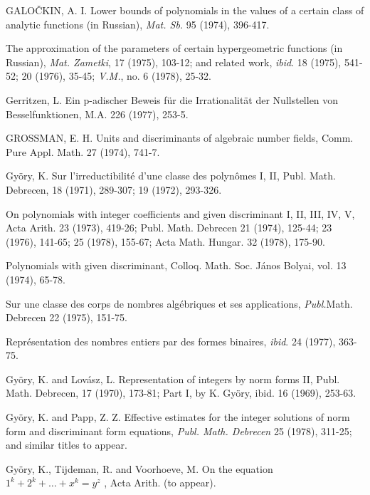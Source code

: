 \begin{hanglist}
    \item GALOČKIN, A. I. Lower bounds of polynomials in the values of a certain class of analytic functions (in Russian), \textit{Mat. Sb.} 95 (1974), 396-417.
    \item \hspace{1.5em} The approximation of the parameters of certain hypergeometric functions (in Russian), \textit{Mat. Zametki}, 17 (1975), 103-12; and related work, \textit{ibid}. 18 (1975), 541-52; 20 (1976), 35-45; \textit{V.M.}, no. 6 (1978), 25-32.
    \item Gerritzen, L. Ein p-adischer Beweis für die Irrationalität der Nullstellen von Besselfunktionen, M.A. 226 (1977), 253-5.
    \item GROSSMAN, E. H. Units and discriminants of algebraic number fields, Comm. Pure Appl. Math. 27 (1974), 741-7.
    \item Györy, K. Sur l'irreductibilité d'une classe des polynômes I, II, Publ. Math. Debrecen, 18 (1971), 289-307; 19 (1972), 293-326.
    \item \hspace{1.5em} On polynomials with integer coefficients and given discriminant I, II, III, IV, V, Acta Arith. 23 (1973), 419-26; Publ. Math. Debrecen 21 (1974), 125-44; 23 (1976), 141-65; 25 (1978), 155-67; Acta Math. Hungar. 32 (1978), 175-90.
    \item \hspace{1.5em} Polynomials with given discriminant, Colloq. Math. Soc. János Bolyai, vol. 13 (1974), 65-78.
    \item \hspace{1.5em} Sur une classe des corps de nombres algébriques et ses applications, \textit{Publ.}Math. Debrecen 22 (1975), 151-75.
    \item \hspace{1.5em} Représentation des nombres entiers par des formes binaires, \textit{ibid}. 24 (1977), 363-75.
    \item Györy, K. and Lovász, L. Representation of integers by norm forms II, Publ. Math. Debrecen, 17 (1970), 173-81; Part I, by K. Györy, ibid. 16 (1969), 253-63.
    \item Györy, K. and Papp, Z. Z. Effective estimates for the integer solutions of norm form and discriminant form equations, \textit{Publ. Math. Debrecen} 25 (1978), 311-25; and similar titles to appear.
    \item Györy, K., Tijdeman, R. and Voorhoeve, M. On the equation  $1^k + 2^k + \dots + x^k = y^z$ , Acta Arith. (to appear).

\end{hanglist}
